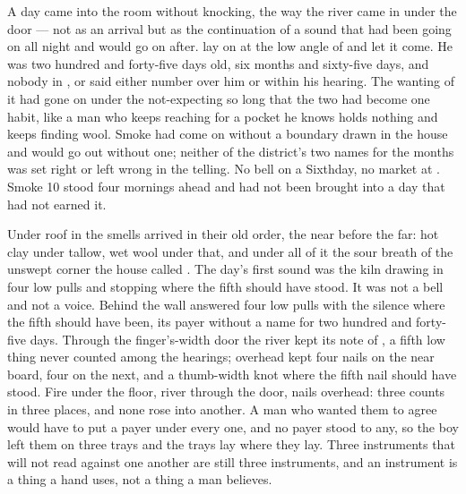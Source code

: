 
A day came into the room without knocking, the way the river came in under the door --- not as an arrival but as the continuation of a sound that had been going on all night and would go on after.  lay on  at the low angle of  and let it come. He was two hundred and forty-five days old, six months and sixty-five days, and nobody in ,  or  said either number over him or within his hearing. The wanting of it had gone on under the not-expecting so long that the two had become one habit, like a man who keeps reaching for a pocket he knows holds nothing and keeps finding wool. Smoke had come on without a boundary drawn in the house and would go out without one; neither of the district's two names for the months was set right or left wrong in the telling. No bell on a Sixthday, no market at . Smoke 10 stood four mornings ahead and had not been brought into a day that had not earned it.

Under  roof in  the smells arrived in their old order, the near before the far: hot clay under tallow, wet wool under that, and under all of it the sour  breath of the unswept corner the house called . The day's first sound was the kiln drawing in four low pulls and stopping where the fifth should have stood. It was not a bell and not a voice. Behind the wall  answered four low pulls with the silence where the fifth should have been, its payer without a name for two hundred and forty-five days. Through the finger's-width door the river kept its note of , a fifth low thing never counted among the hearings; overhead  kept four nails on the near board, four on the next, and a thumb-width knot where the fifth nail should have stood. Fire under the floor, river through the door, nails overhead: three counts in three places, and none rose into another. A man who wanted them to agree would have to put a payer under every one, and no payer stood to any, so the boy left them on three trays and the trays lay where they lay. Three instruments that will not read against one another are still three instruments, and an instrument is a thing a hand uses, not a thing a man believes.

